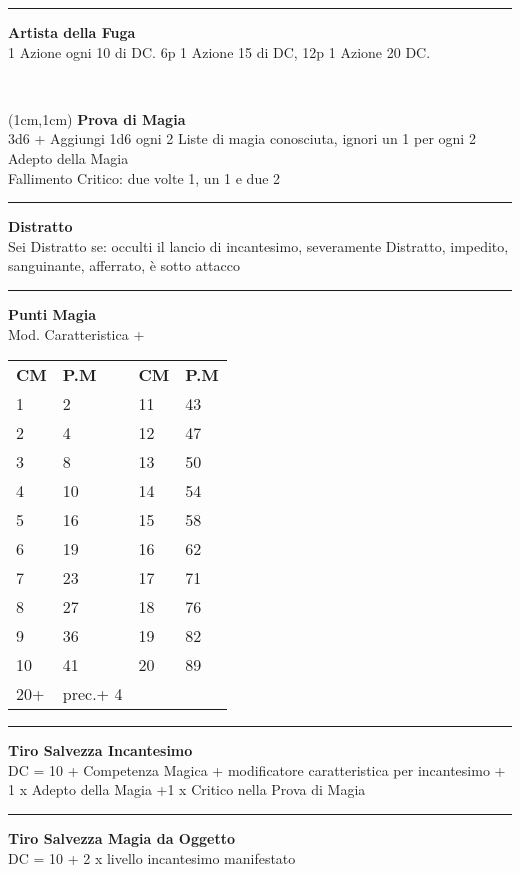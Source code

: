 \documentclass[a4paper,12 pt,openany]{book}
\newcommand{\riga}{\rule{\textwidth}{0.4pt}}
\begin{document}
\begin{textblock*}{7cm}
\riga

\textbf{Artista della Fuga}\\
1 Azione ogni 10 di DC. 6p 1 Azione 15 di DC, 12p 1 Azione 20 DC.

\end{textblock*}

~\newpage

\begin{textblock*}{5cm}(1cm,1cm) %
\textbf{Prova di Magia}\\
3d6 + Aggiungi 1d6 ogni 2 Liste di magia conosciuta, ignori un 1 per ogni 2 Adepto della Magia\\
Fallimento Critico: due volte 1, un 1 e due 2\\


\riga

\textbf{Distratto}\\
Sei Distratto se: occulti il lancio di incantesimo, severamente Distratto, impedito, sanguinante, afferrato, è sotto attacco\\

\riga

\textbf{Punti Magia}\\
Mod. Caratteristica + \\

\begin{tabular}{ll|ll}
\textbf{CM} & \textbf{P.M}&	\textbf{CM} & \textbf{P.M}\\
	1&	2 	&11&43\\
2&	4	&12&47\\
3&	8	&13&50\\
4&	10	&14&54\\
5&	16	&15&58\\
6&	19	&16&62\\
7&	23	&17&71\\
8&	27	&18&76\\
9&	36	&19&82\\
10&	41	&20&89\\
20+&prec.+ 4&&\\
\end{tabular}

\riga

\textbf{Tiro Salvezza Incantesimo}\\
DC = 10 + Competenza Magica + modificatore caratteristica per incantesimo + 1 x Adepto della Magia +1 x Critico nella Prova di Magia

\riga

\textbf{Tiro Salvezza Magia da Oggetto}\\
DC = 10 + 2 x livello incantesimo manifestato


\end{textblock*}
\end{document}
